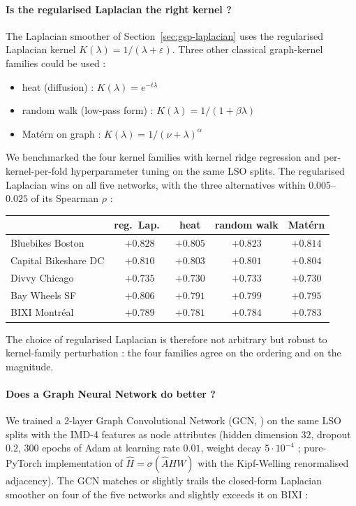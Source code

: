 \paragraph{Is the regularised Laplacian the right kernel ?}
The Laplacian smoother of Section~\ref{sec:gsp-laplacian} uses
the regularised Laplacian kernel $K(\lambda) = 1/(\lambda + \varepsilon)$.
Three other classical graph-kernel families could be used :
\begin{itemize}[label=$\bullet$,leftmargin=*]
    \item heat (diffusion) : $K(\lambda) = e^{-t \lambda}$
    \item random walk (low-pass form) : $K(\lambda) = 1/(1 + \beta \lambda)$
    \item Mat\'ern on graph : $K(\lambda) = 1/(\nu + \lambda)^{\alpha}$
\end{itemize}
We benchmarked the four kernel families with kernel ridge
regression and per-kernel-per-fold hyperparameter tuning on the
same LSO splits.  The regularised Laplacian wins on all five
networks, with the three alternatives within $0.005$--$0.025$ of
its Spearman $\rho$ :

\begin{center}
\small
\begin{tabular}{@{}lcccc@{}}
\toprule
                       & reg.\ Lap.\ & heat & random walk & Mat\'ern \\
\midrule
Bluebikes Boston       & $\mathbf{+0.828}$ & $+0.805$ & $+0.823$ & $+0.814$ \\
Capital Bikeshare DC    & $\mathbf{+0.810}$ & $+0.803$ & $+0.801$ & $+0.804$ \\
Divvy Chicago          & $\mathbf{+0.735}$ & $+0.730$ & $+0.733$ & $+0.730$ \\
Bay Wheels SF          & $\mathbf{+0.806}$ & $+0.791$ & $+0.799$ & $+0.795$ \\
BIXI Montr\'eal         & $\mathbf{+0.789}$ & $+0.781$ & $+0.784$ & $+0.783$ \\
\bottomrule
\end{tabular}
\end{center}
The choice of regularised Laplacian is therefore not arbitrary
but robust to kernel-family perturbation : the four families
agree on the ordering and on the magnitude.

\paragraph{Does a Graph Neural Network do better ?}
We trained a 2-layer Graph Convolutional Network (GCN,
\citealp{Kipf2017}) on the same LSO splits with the IMD-4
features as node attributes (hidden dimension $32$, dropout
$0.2$, $300$ epochs of Adam at learning rate $0.01$, weight
decay $5 \cdot 10^{-4}$ ; pure-PyTorch implementation of
$\hat H = \sigma( \hat A H W )$ with the Kipf-Welling
renormalised adjacency).  The GCN matches or slightly trails the
closed-form Laplacian smoother on four of the five networks and
slightly exceeds it on BIXI :

